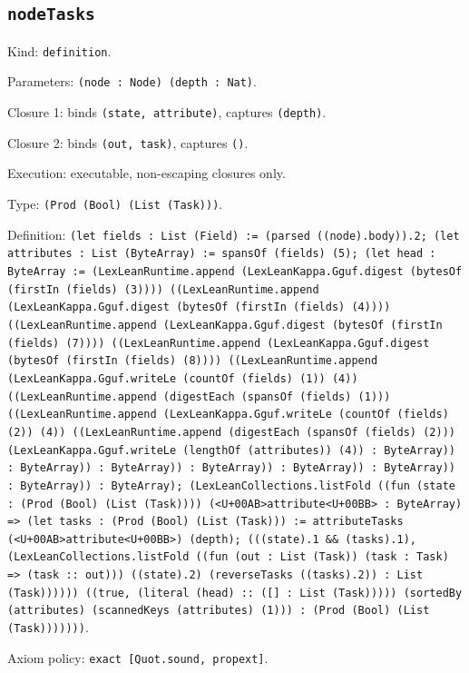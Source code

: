 \documentclass[11pt]{article}
\begin{document}
\subsection*{\texttt{nodeTasks}}
\noindent Kind: \texttt{definition}.\par
\noindent Parameters: \texttt{(node : Node) (depth : Nat)}.\par
\noindent Closure 1: binds \texttt{(state, attribute)}, captures \texttt{(depth)}.\par
\noindent Closure 2: binds \texttt{(out, task)}, captures \texttt{()}.\par
\noindent Execution: executable, non-escaping closures only.\par
\noindent Type: \texttt{(Prod (Bool) (List (Task)))}.\par
\noindent Definition: \texttt{(let fields : List (Field) := (parsed ((node).body)).2; (let attributes : List (ByteArray) := spansOf (fields) (5); (let head : ByteArray := (LexLeanRuntime.append (LexLeanKappa.Gguf.digest (bytesOf (firstIn (fields) (3)))) ((LexLeanRuntime.append (LexLeanKappa.Gguf.digest (bytesOf (firstIn (fields) (4)))) ((LexLeanRuntime.append (LexLeanKappa.Gguf.digest (bytesOf (firstIn (fields) (7)))) ((LexLeanRuntime.append (LexLeanKappa.Gguf.digest (bytesOf (firstIn (fields) (8)))) ((LexLeanRuntime.append (LexLeanKappa.Gguf.writeLe (countOf (fields) (1)) (4)) ((LexLeanRuntime.append (digestEach (spansOf (fields) (1))) ((LexLeanRuntime.append (LexLeanKappa.Gguf.writeLe (countOf (fields) (2)) (4)) ((LexLeanRuntime.append (digestEach (spansOf (fields) (2))) (LexLeanKappa.Gguf.writeLe (lengthOf (attributes)) (4)) : ByteArray)) : ByteArray)) : ByteArray)) : ByteArray)) : ByteArray)) : ByteArray)) : ByteArray)) : ByteArray); (LexLeanCollections.listFold ((fun (state : (Prod (Bool) (List (Task)))) (<U+00AB>attribute<U+00BB> : ByteArray) => (let tasks : (Prod (Bool) (List (Task))) := attributeTasks (<U+00AB>attribute<U+00BB>) (depth); (((state).1 \&\& (tasks).1), (LexLeanCollections.listFold ((fun (out : List (Task)) (task : Task) => (task :: out))) ((state).2) (reverseTasks ((tasks).2)) : List (Task)))))) ((true, (literal (head) :: ([] : List (Task))))) (sortedBy (attributes) (scannedKeys (attributes) (1))) : (Prod (Bool) (List (Task)))))))}.\par
\noindent Axiom policy: \texttt{exact [Quot.sound, propext]}.\par
\end{document}
